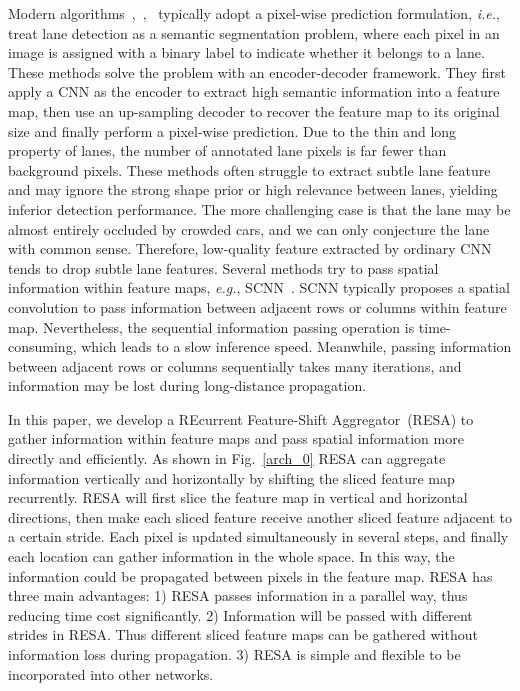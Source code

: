 \documentclass[letterpaper]{article} \usepackage{aaai21}  \usepackage{times}  \usepackage{helvet} \usepackage{courier}  \usepackage[hyphens]{url}  \usepackage{graphicx} \urlstyle{rm} \def\UrlFont{\rm}  \usepackage{natbib}  \usepackage{caption} \frenchspacing  \setlength{\pdfpagewidth}{8.5in}  \setlength{\pdfpageheight}{11in}  \usepackage{amsmath}
\begin{document}
Modern algorithms~\citep{inproceedings},~\citep{Bergasa2018},~\citep{Chen2019} typically adopt a pixel-wise prediction formulation, \emph{i.e.}, treat lane detection as a semantic segmentation problem, where each pixel in an image is assigned with a binary label to indicate whether it belongs to a lane. These methods solve the problem with an encoder-decoder framework. They first apply a CNN as the encoder to extract high semantic information into a feature map, then use an up-sampling decoder to recover the feature map to its original size and finally perform a pixel-wise prediction. Due to the thin and long property of lanes, the number of annotated lane pixels is far fewer than background pixels. These methods often struggle to extract subtle lane feature and may ignore the strong shape prior or high relevance between lanes, yielding inferior detection performance. The more challenging case is that the lane may be almost entirely occluded by crowded cars, and we can only conjecture the lane with common sense. Therefore, low-quality feature extracted by ordinary CNN tends to drop subtle lane features. Several methods try to pass spatial information within feature maps, \emph{e.g.}, SCNN~\citep{pan2018spatial}. SCNN typically proposes a spatial convolution to pass information between adjacent rows or columns within feature map. Nevertheless, the sequential information passing operation is time-consuming, which leads to a slow inference speed. Meanwhile, passing information between adjacent rows or columns sequentially takes many iterations, and information may be lost during long-distance propagation.

In this paper, we develop a REcurrent Feature-Shift Aggregator~(RESA) to gather information within feature maps and pass spatial information more directly and efficiently. As shown in Fig.~\ref{arch_0} RESA can aggregate information vertically and horizontally by shifting the sliced feature map recurrently. RESA will first slice the feature map in vertical and horizontal directions, then make each sliced feature receive another sliced feature adjacent to a certain stride. Each pixel is updated simultaneously in several steps, and finally each location can gather information in the whole space. In this way, the information could be propagated between pixels in the feature map.
RESA has three main advantages: 1) RESA passes information in a parallel way, thus reducing time cost significantly. 2) Information will be passed with different strides in RESA. Thus different sliced feature maps can be gathered without information loss during propagation. 3) RESA is simple and flexible to be incorporated into other networks.
\end{document}
